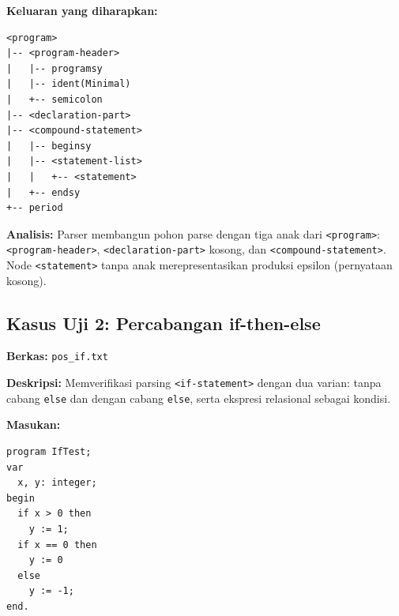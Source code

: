 \documentclass[12pt,a4paper]{article}
\begin{document}
\textbf{Keluaran yang diharapkan:}
\begin{lstlisting}[style=default]
<program>
|-- <program-header>
|   |-- programsy
|   |-- ident(Minimal)
|   +-- semicolon
|-- <declaration-part>
|-- <compound-statement>
|   |-- beginsy
|   |-- <statement-list>
|   |   +-- <statement>
|   +-- endsy
+-- period
\end{lstlisting}

\textbf{Analisis:} Parser membangun pohon parse dengan tiga anak dari \texttt{<program>}: \texttt{<program-header>}, \texttt{<declaration-part>} kosong, dan \texttt{<compound-statement>}. Node \texttt{<statement>} tanpa anak merepresentasikan produksi epsilon (pernyataan kosong).

\subsection{Kasus Uji 2: Percabangan if-then-else}
\textbf{Berkas:} \texttt{pos\_if.txt}

\textbf{Deskripsi:} Memverifikasi parsing \texttt{<if-statement>} dengan dua varian: tanpa cabang \texttt{else} dan dengan cabang \texttt{else}, serta ekspresi relasional sebagai kondisi.

\textbf{Masukan:}
\begin{lstlisting}[style=default]
program IfTest;
var
  x, y: integer;
begin
  if x > 0 then
    y := 1;
  if x == 0 then
    y := 0
  else
    y := -1;
end.
\end{lstlisting}
\end{document}
